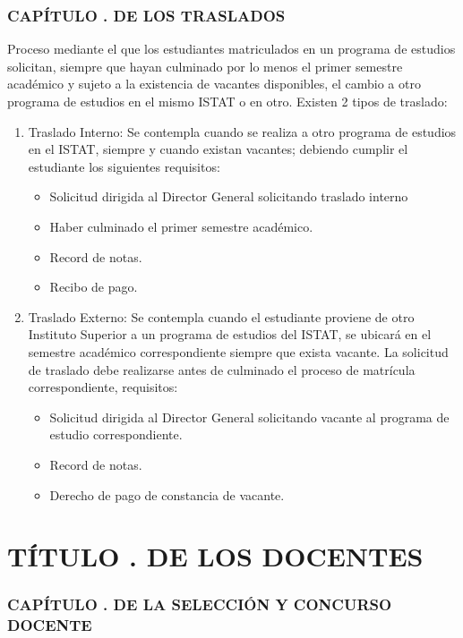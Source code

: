 \section{CAPÍTULO . DE LOS TRASLADOS}
\setcounter{re}{1}
Proceso mediante el que los estudiantes matriculados en un programa de estudios solicitan, siempre que hayan culminado por lo menos el primer semestre académico y sujeto a la existencia de vacantes disponibles, el cambio a otro programa de estudios en el mismo ISTAT o en otro. Existen 2 tipos de traslado: 
\begin{enumerate}
\item Traslado Interno: Se contempla cuando se realiza a otro programa de estudios en el ISTAT, siempre y cuando existan vacantes; debiendo cumplir el estudiante los siguientes requisitos: 
	\begin{itemize}
		\item Solicitud dirigida al Director General solicitando traslado interno 
		\item Haber culminado el primer semestre académico. 
		\item Record de notas.
		\item Recibo de pago. 
	\end{itemize}

\item Traslado Externo: Se contempla cuando el estudiante proviene de otro Instituto Superior a un programa de estudios del ISTAT, se ubicará en el semestre académico correspondiente siempre que exista vacante. La solicitud de traslado debe realizarse antes de culminado el proceso de matrícula correspondiente, requisitos: 
	\begin{itemize}
		\item Solicitud dirigida al Director General solicitando vacante al programa de estudio correspondiente. 
		\item Record de notas. 
		\item Derecho de pago de constancia de vacante.
	\end{itemize}
\end{enumerate}
\part{TÍTULO . DE LOS DOCENTES}
\addtocounter{ns}{1}
\section{CAPÍTULO . DE LA SELECCIÓN Y CONCURSO DOCENTE}
\addtocounter{re}{1}

